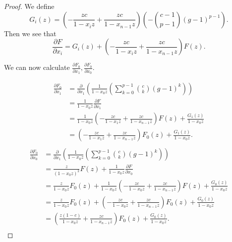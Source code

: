 \documentclass{article}
\numberwithin{equation}{section}
\begin{document}
\begin{proof}
%

We define $$G_i(z)=\left(-\frac{zc}{1-x_iz}+\frac{zc}{1-x_{n-1}z}\right)\left(-\binom{c-1}{p-1}(g-1)^{p-1}\right).$$ Then we see that $$\frac{\partial F}{\partial x_i}=G_i(z)+\left(-\frac{zc}{1-x_iz}+\frac{zc}{1-x_{n-1}z}\right)F(z).$$

We can now calculate $\frac{\partial F_0}{\partial x_1},\frac{\partial F_0}{\partial x_0}$. 

\begin{align*}
\frac{\partial F_0}{\partial x_1}&=\frac{\partial}{\partial x_1}\left(\frac{1}{1-x_0z}\left(\sum_{k=0}^{p-1} \binom{c}{k} (g-1)^k\right)\right)\\
&=\frac{1}{1-x_0z}\frac{\partial F}{\partial x_1}\\
&=\frac{1}{1-x_0z}\left(-\frac{zc}{1-x_1z}+\frac{zc}{1-x_{n-1}z}\right)F(z)+\frac{G_1(z)}{1-x_0z}\\
&=\left(-\frac{zc}{1-x_1z}+\frac{zc}{1-x_{n-1}z}\right)F_0(z)+\frac{G_1(z)}{1-x_0z}.\\
\end{align*}
\begin{align*}
\frac{\partial F_0}{\partial x_0}&=\frac{\partial}{\partial x_1}\left(\frac{1}{1-x_0z}\left(\sum_{k=0}^{p-1} \binom{c}{k} (g-1)^k\right)\right)\\
&=\frac{z}{(1-x_0z)^2}F(z)+\frac{1}{1-x_0z}\frac{\partial F}{\partial x_0}\\
&=\frac{z}{1-x_0z}F_0(z)+\frac{1}{1-x_0z}\left(-\frac{zc}{1-x_0z}+\frac{zc}{1-x_{n-1}z}\right)F(z)+\frac{G_0(z)}{1-x_0z}\\
&=\frac{z}{1-x_0z}F_0(z)+\left(-\frac{zc}{1-x_0z}+\frac{zc}{1-x_{n-1}z}\right)F_0(z)+\frac{G_0(z)}{1-x_0z}\\
&=\left(\frac{z(1-c)}{1-x_0z}+\frac{zc}{1-x_{n-1}z}\right)F_0(z)+\frac{G_0(z)}{1-x_0z}.\\
\end{align*}


\end{proof}
\end{document}
